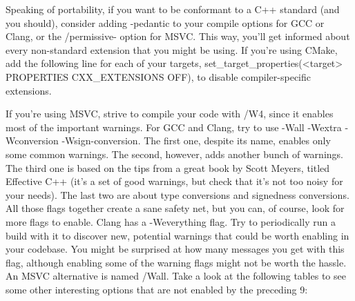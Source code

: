 Speaking of portability, if you want to be conformant to a C++ standard (and you should), consider adding -pedantic to your compile options for GCC or Clang, or the /permissive- option for MSVC. This way, you'll get informed about every non-standard extension that you might be using. If you're using CMake, add the following line for each of your targets, set\_target\_properties(<target> PROPERTIES CXX\_EXTENSIONS OFF), to disable compiler-specific extensions.

If you're using MSVC, strive to compile your code with /W4, since it enables most of the important warnings. For GCC and Clang, try to use -Wall -Wextra -Wconversion -Wsign-conversion. The first one, despite its name, enables only some common warnings. The second, however, adds another bunch of warnings. The third one is based on the tips from a great book by Scott Meyers, titled Effective C++ (it's a set of good warnings, but check that it's not too noisy for your needs). The last two are about type conversions and signedness conversions. All those flags together create a sane safety net, but you can, of course, look for more flags to enable. Clang has a -Weverything flag. Try to periodically run a build with it to discover new, potential warnings that could be worth enabling in your codebase. You might be surprised at how many messages you get with this flag, although enabling some of the warning flags might not be worth the hassle. An MSVC alternative is named /Wall. Take a look at the following tables to see some other interesting options that are not enabled by the preceding 9:

